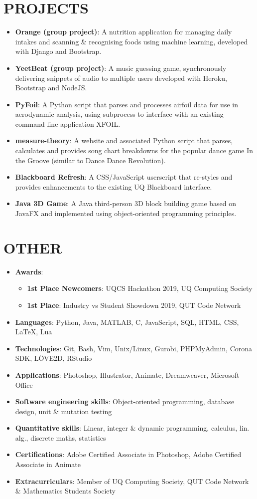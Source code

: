 \documentclass[a4paper, 10pt]{article}
\newcommand{\resumeItem}[2]{
  \item\small{
    \textbf{#1}{: #2 \vspace{-2pt}}
  }
}
\newcommand{\resumeSubItem}[2]{\resumeItem{#1}{#2}\vspace{-4pt}}
\newcommand{\resumeSubHeadingListStart}{\begin{itemize}[leftmargin=*]}
\newcommand{\resumeSubHeadingListEnd}{\end{itemize}}
\newcommand{\resumeItemListStart}{\begin{itemize}}
\newcommand{\resumeItemListEnd}{\end{itemize}\vspace{-5pt}}
\begin{document}
\section{PROJECTS}
  \resumeSubHeadingListStart
    \resumeSubItem{Orange (group project)}
      {A nutrition application for managing daily intakes and scanning \& recognising foods using machine learning, developed with Django and Bootstrap.}
    \resumeSubItem{YeetBeat (group project)}
      {A music guessing game, synchronously delivering snippets of audio to multiple users developed with Heroku, Bootstrap and NodeJS.}
  	\resumeSubItem{PyFoil}
      {A Python script that parses and processes airfoil data for use in aerodynamic analysis, using subprocess to interface with an existing command-line application XFOIL.}
    \resumeSubItem{measure-theory}
      {A website and associated Python script that parses, calculates and provides song chart breakdowns for the popular dance game In the Groove (similar to Dance Dance Revolution).}
    \resumeSubItem{Blackboard Refresh}
      {A CSS/JavaScript userscript that re-styles and provides enhancements to the existing UQ Blackboard interface.}
    \resumeSubItem{Java 3D Game}
      {A Java third-person 3D block building game based on JavaFX and implemented using object-oriented programming principles.}
  \resumeSubHeadingListEnd


\section{OTHER}
  \resumeSubHeadingListStart
    \resumeSubItem{Awards}
        {}
    \resumeItemListStart
      \resumeItem{1st Place Newcomers}{UQCS Hackathon 2019, UQ Computing Society}
      \resumeItem{1st Place}{Industry vs Student Showdown 2019, QUT Code Network}
    \resumeItemListEnd
    \resumeSubItem{Languages}
      {Python, Java, MATLAB, C, JavaScript, SQL, HTML, CSS, \LaTeX, Lua}
    \resumeSubItem{Technologies}
      {Git, Bash, Vim, Unix/Linux, Gurobi, PHPMyAdmin, Corona SDK, LÖVE2D, RStudio}
    \resumeSubItem{Applications}
      {Photoshop, Illustrator, Animate, Dreamweaver, Microsoft Office}
    \resumeSubItem{Software engineering skills}
      {Object-oriented programming, database design, unit \& mutation testing}
    \resumeSubItem{Quantitative skills}
      {Linear, integer \& dynamic programming, calculus, lin. alg., discrete maths, statistics}
    \resumeSubItem{Certifications}
      {Adobe Certified Associate in Photoshop, Adobe Certified Associate in Animate}
    \resumeSubItem{Extracurriculars}
      {Member of UQ Computing Society, QUT Code Network \& Mathematics Students Society}
  \resumeSubHeadingListEnd


\end{document}
